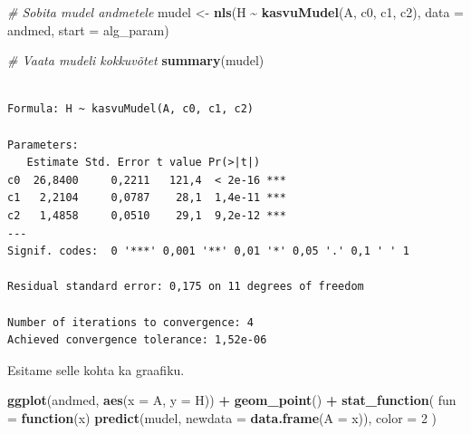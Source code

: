 \documentclass[
]{book}
\newenvironment{Shaded}{\begin{snugshade}}{\end{snugshade}}
\newcommand{\AttributeTok}[1]{\textcolor[rgb]{0.13,0.29,0.53}{#1}}
\newcommand{\CommentTok}[1]{\textcolor[rgb]{0.56,0.35,0.01}{\textit{#1}}}
\newcommand{\ControlFlowTok}[1]{\textcolor[rgb]{0.13,0.29,0.53}{\textbf{#1}}}
\newcommand{\DecValTok}[1]{\textcolor[rgb]{0.00,0.00,0.81}{#1}}
\newcommand{\FunctionTok}[1]{\textcolor[rgb]{0.13,0.29,0.53}{\textbf{#1}}}
\newcommand{\NormalTok}[1]{#1}
\newcommand{\OtherTok}[1]{\textcolor[rgb]{0.56,0.35,0.01}{#1}}
\newcommand{\SpecialCharTok}[1]{\textcolor[rgb]{0.81,0.36,0.00}{\textbf{#1}}}
\renewenvironment{Shaded} {\begin{snugshade}\footnotesize} {\end{snugshade}}
\theoremstyle{definition}
\theoremstyle{definition}
\theoremstyle{definition}
\theoremstyle{definition}
\theoremstyle{remark}
\begin{document}
\begin{Shaded}
\begin{Highlighting}[]
\CommentTok{\# Sobita mudel andmetele}
\NormalTok{mudel }\OtherTok{\textless{}{-}} \FunctionTok{nls}\NormalTok{(H }\SpecialCharTok{\textasciitilde{}} \FunctionTok{kasvuMudel}\NormalTok{(A, c0, c1, c2), }\AttributeTok{data =}\NormalTok{ andmed, }\AttributeTok{start =}\NormalTok{ alg\_param)}
\end{Highlighting}
\end{Shaded}

\begin{Shaded}
\begin{Highlighting}[]
\CommentTok{\# Vaata mudeli kokkuvõtet}
\FunctionTok{summary}\NormalTok{(mudel)}
\end{Highlighting}
\end{Shaded}

\begin{verbatim}

Formula: H ~ kasvuMudel(A, c0, c1, c2)

Parameters:
   Estimate Std. Error t value Pr(>|t|)    
c0  26,8400     0,2211   121,4  < 2e-16 ***
c1   2,2104     0,0787    28,1  1,4e-11 ***
c2   1,4858     0,0510    29,1  9,2e-12 ***
---
Signif. codes:  0 '***' 0,001 '**' 0,01 '*' 0,05 '.' 0,1 ' ' 1

Residual standard error: 0,175 on 11 degrees of freedom

Number of iterations to convergence: 4 
Achieved convergence tolerance: 1,52e-06
\end{verbatim}

Esitame selle kohta ka graafiku.

\begin{Shaded}
\begin{Highlighting}[]
\FunctionTok{ggplot}\NormalTok{(andmed, }\FunctionTok{aes}\NormalTok{(}\AttributeTok{x =}\NormalTok{ A, }\AttributeTok{y =}\NormalTok{ H)) }\SpecialCharTok{+}
  \FunctionTok{geom\_point}\NormalTok{() }\SpecialCharTok{+}
  \FunctionTok{stat\_function}\NormalTok{(}
    \AttributeTok{fun =} \ControlFlowTok{function}\NormalTok{(x)}
      \FunctionTok{predict}\NormalTok{(mudel, }\AttributeTok{newdata =} \FunctionTok{data.frame}\NormalTok{(}\AttributeTok{A =}\NormalTok{ x)),}
    \AttributeTok{color =} \DecValTok{2}
\NormalTok{  ) }
\end{Highlighting}
\end{Shaded}
\end{document}
